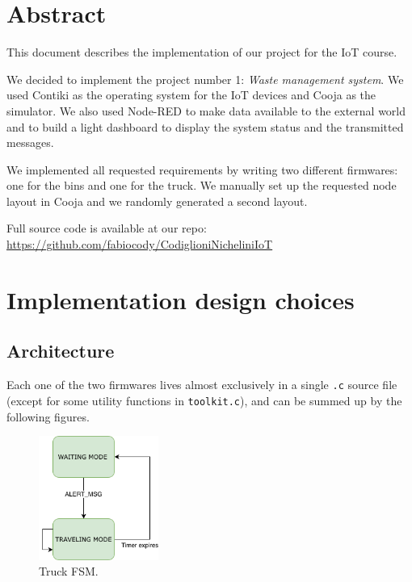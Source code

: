 \documentclass[a4paper, 11pt, parskip=half]{scrartcl}
\begin{document}
\begin{titlepage}
\vfill %

\end{titlepage}

\tableofcontents          %
\listoffigures
\newpage


\section{Abstract}
This document describes the implementation of our project for the IoT course.

We decided to implement the project number 1: \textit{Waste management system}. We used Contiki as the operating system for the IoT devices and Cooja as the simulator. We also used Node-RED to make data available to the external world and to build a light dashboard to display the system status and the transmitted messages.

We implemented all requested requirements by writing two different firmwares: one for the bins and one for the truck. We manually set up the requested node layout in Cooja and we randomly generated a second layout.

Full source code is available at our repo: \\
\url{https://github.com/fabiocody/CodiglioniNicheliniIoT}

\section{Implementation design choices}

\subsection{Architecture}

Each one of the two firmwares lives almost exclusively in a single \texttt{.c} source file (except for some utility functions in \texttt{toolkit.c}), and can be summed up by the following figures.

\begin{figure}[H]
	\centering
	\includegraphics[width=0.35\textwidth]{resources/truck_state_chart}
	\caption{Truck FSM.}
	\label{fig:truck-fsm}
\end{figure}
\end{document}
